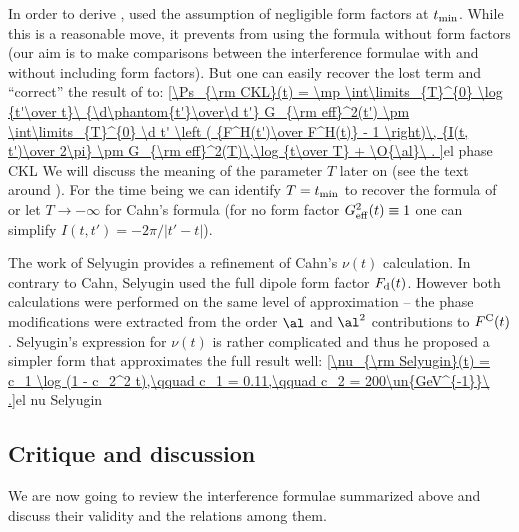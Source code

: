 In order to derive , \KaL{} used the assumption of negligible form factors at $t_{\rm min}$. While this is a reasonable move, it prevents from using the formula without form factors (our aim is to make comparisons between the interference formulae with and without including form factors). But one can easily recover the lost term and ``correct'' the result of \KL{} to:
\eqref{\Ps_{\rm CKL}(t) =
	\mp \int\limits_{T}^{0} \log {t'\over t}\ {\d\phantom{t'}\over\d t'} G_{\rm eff}^2(t')
	\pm \int\limits_{T}^{0} \d t' \left ( {F^H(t')\over F^H(t)} - 1 \right)\, {I(t, t')\over 2\pi}
	\pm G_{\rm eff}^2(T)\,\log {t\over T}
	+ \O{\al}\ .
}{el phase CKL}
We will discuss the meaning of the parameter $T$ later on (see the text around ). For the time being we can identify $T = t_{\rm min}$ to recover the formula of \KL{} or let $T\to -\infty$ for Cahn's formula (for no form factor $G_{\rm eff}^2(t) \equiv 1$ one can simplify $I(t, t') = -2\pi / |t' - t|$).

The work of Selyugin  provides a refinement of Cahn's $\nu(t)$ calculation. In contrary to Cahn, Selyugin used the full dipole form factor $F_{\rm d}(t)$. However both calculations were performed on the same level of approximation -- the phase modifications were extracted from the order $\al$ and $\al^2$ contributions to $F^{\rm C}(t)$. Selyugin's expression for $\nu(t)$ is rather complicated and thus he proposed a simpler form that approximates the full result well:
\eqref{\nu_{\rm Selyugin}(t) = c_1 \log (1 - c_2^2 t),\qquad c_1 = 0.11,\qquad c_2 = 200\un{GeV^{-1}}\ .}{el nu Selyugin}


\subsection[int cd]{Critique and discussion}

We are now going to review the interference formulae summarized above and discuss their validity and the relations among them.


